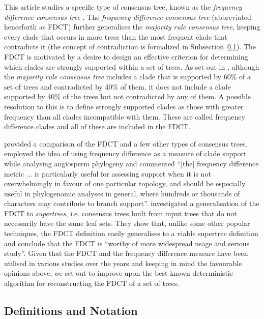 \documentclass[12pt,a4paper]{article}
\begin{document}
    This article studies a specific type of consensus tree, known as the \textit{frequency difference consensus tree} \citep{goloboff2003improvements}. The \textit{frequency difference consensus tree} (abbreviated henceforth as FDCT) further generalises the \textit{majority rule consensus tree}, keeping every clade that occurs in more trees than the most frequent clade that contradicts it (the concept of contradiction is formalized in Subsection~\ref{subsec:def}). The FDCT is motivated by a desire to design an effective criterion for determining which clades are strongly supported within a set of trees. As set out in \cite{goloboff2003improvements}, although the \textit{majority rule consensus tree} includes a clade that is supported by 60\% of a set of trees and contradicted by 40\% of them, it does not include a clade supported by 40\% of the trees but not contradicted by any of them. A possible resolution to this is to define strongly supported clades as those with greater frequency than all clades incompatible with them. These are called frequency difference clades and all of these are included in the FDCT.

    \cite{dong2010majority} provided a comparison of the FDCT and a few other types of consensus trees. \cite{barrett2013plastid} employed the idea of using frequency difference as a measure of clade support while analysing angiosperm phylogeny and commented ``[the] frequency difference metric ... is particularly useful for assessing support when it is not overwhelmingly in favour of one particular topology, and should be especially useful in phylogenomic analyses in general, where hundreds or thousands of characters may contribute to branch support''. \cite{steel2014axiomatic} investigated a generalisation of the FDCT to \textit{supertrees}, i.e. consensus trees built from input trees that do not necessarily have the same leaf sets. They show that, unlike some other popular techniques, the FDCT definition easily generalises to a viable supertree definition and conclude that the FDCT is ``worthy of more widespread usage and serious study''. Given that the FDCT and the frequency difference measure have been utilised in various studies over the years \citep{garcia2014testing,barrett2013plastid,molineri2010cladistic,molineri2013phylogeny,molineri2015phylogeny,lindqvist2006molecular,han2014new} and keeping in mind the favourable opinions above, we set out to improve upon the best known deterministic algorithm for reconstructing the FDCT of a set of trees.

    \subsection{Definitions and Notation}
    \label{subsec:def}
\end{document}
